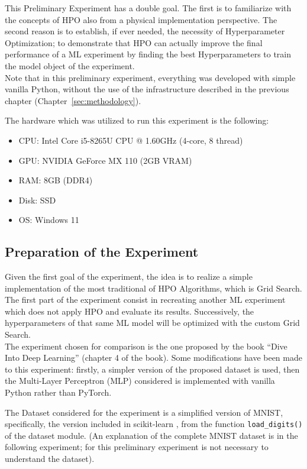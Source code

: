 This Preliminary Experiment has a double goal.
The first is to familiarize with the concepts of HPO also from a physical implementation perspective.
The second reason is to establish, if ever needed, the necessity of Hyperparameter Optimization; to demonstrate that HPO can actually improve the final performance of a ML experiment by finding the best Hyperparameters to train the model object of the experiment.
\\[0.3cm]Note that in this preliminary experiment, everything was developed with simple vanilla Python, without the use of the infrastructure described in the previous chapter (Chapter~\ref{sec:methodology}).

The hardware which was utilized to run this experiment is the following:
\begin{itemize}[itemsep=0.1cm]
    \item CPU: Intel Core i5-8265U CPU @ 1.60GHz (4-core, 8 thread)
    \item GPU: NVIDIA GeForce MX 110 (2GB VRAM)
    \item RAM: 8GB (DDR4)
    \item Disk: SSD
    \item OS: Windows 11
\end{itemize}

\subsection{Preparation of the Experiment}

Given the first goal of the experiment, the idea is to realize a simple implementation of the most traditional of HPO Algorithms, which is Grid Search.
\\[0.3cm]The first part of the experiment consist in recreating another ML experiment which does not apply HPO and evaluate its results. Successively, the hyperparameters of that same ML model will be optimized with the custom Grid Search.
\\[0.3cm]The experiment chosen for comparison is the one proposed by the book “Dive Into Deep Learning” \cite{Tesi-1.6} (chapter 4 of the book). Some modifications have been made to this experiment: firstly, a simpler version of the proposed dataset is used, then the Multi-Layer Perceptron (MLP) considered is implemented with vanilla Python rather than PyTorch.

The Dataset considered for the experiment is a simplified version of MNIST, specifically, the version included in scikit-learn \cite{scikit-learn}, from the function \texttt{load\_digits()} of the dataset module. (An explanation of the complete MNIST dataset is in the following experiment; for this preliminary experiment is not necessary to understand the dataset).

